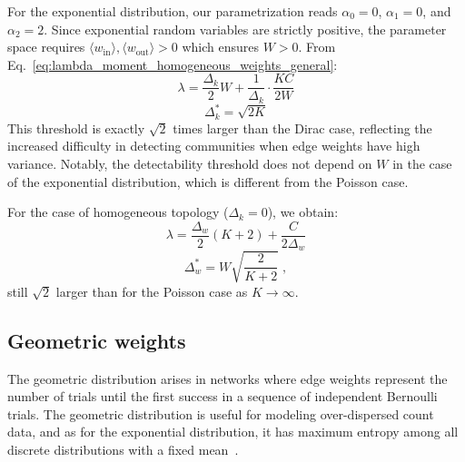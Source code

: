 \documentclass[a4paper,pre,superscriptaddress,floatfix,nofootinbib,twocolumn]{revtex4-1}
\begin{document}
For the exponential distribution,
our parametrization reads $\alpha_0 = 0$, $\alpha_1 = 0$, and $\alpha_2 = 2$. Since exponential random variables are strictly positive, the parameter space requires
$\langle w_{\text{in}} \rangle, \langle w_{\text{out}} \rangle > 0$
which ensures $W > 0$. From Eq.~\eqref{eq:lambda_moment_homogeneous_weights_general}:
\begin{equation}
\lambda = \frac{\Delta_{k}}{2}W + \frac{1}{\Delta_{k}} \cdot \frac{KC}{2W}
\label{eq:lambda_expon}
\end{equation}
\begin{equation}
\Delta_k^* = \sqrt{2K}
\label{eq:expon_det}
\end{equation}
This threshold is exactly $\sqrt{2}$ times larger than the Dirac case, reflecting the increased difficulty in detecting communities when edge weights have high variance.
Notably, the detectability threshold does not depend on $W$ in the case of the exponential distribution, which is different from the Poisson case.

For the case of homogeneous topology ($\Delta_k = 0$), we obtain:
\begin{equation}
\lambda = \frac{\Delta_{w}}{2} \left(K + 2 \right) + \frac{C}{2 \Delta_{w}}
\label{eq:lambda_expon_w}
\end{equation}
\begin{equation}
\Delta_{w}^* = W\sqrt{\frac{2}{K+2}} \; ,
\label{eq:expon_w_det}
\end{equation}
still $\sqrt{2}$ larger than for the Poisson case as $K \to \infty$.

\subsection*{Geometric weights}

The geometric distribution arises in networks where edge weights represent the number of trials until the first success in a sequence of independent Bernoulli trials. The geometric distribution is useful for modeling over-dispersed count data, and as for the exponential distribution, it has maximum entropy among all discrete distributions with a fixed mean~\cite{bianconi2007entropy,bianconi2009entropy, garlaschelli2009generalized,vallarano2021fast}.
\end{document}
